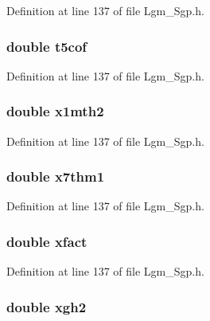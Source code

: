 Definition at line 137 of file Lgm\_\-Sgp.h.\hypertarget{struct___sgp_info_3770068f50d6a8b4a73dcec1e8967087}{
\subsubsection[{t5cof}]{\setlength{\rightskip}{0pt plus 5cm}double {\bf t5cof}}}
\label{struct___sgp_info_3770068f50d6a8b4a73dcec1e8967087}




Definition at line 137 of file Lgm\_\-Sgp.h.\hypertarget{struct___sgp_info_1e0131f4c92de0fd372d35e3b9edb9f4}{
\subsubsection[{x1mth2}]{\setlength{\rightskip}{0pt plus 5cm}double {\bf x1mth2}}}
\label{struct___sgp_info_1e0131f4c92de0fd372d35e3b9edb9f4}




Definition at line 137 of file Lgm\_\-Sgp.h.\hypertarget{struct___sgp_info_1db2d8883d9dd784b6ae51a031c1266e}{
\subsubsection[{x7thm1}]{\setlength{\rightskip}{0pt plus 5cm}double {\bf x7thm1}}}
\label{struct___sgp_info_1db2d8883d9dd784b6ae51a031c1266e}




Definition at line 137 of file Lgm\_\-Sgp.h.\hypertarget{struct___sgp_info_34389a85dd8a65ed941cc23793d4efbf}{
\subsubsection[{xfact}]{\setlength{\rightskip}{0pt plus 5cm}double {\bf xfact}}}
\label{struct___sgp_info_34389a85dd8a65ed941cc23793d4efbf}




Definition at line 137 of file Lgm\_\-Sgp.h.\hypertarget{struct___sgp_info_12cc589dda276aa5ae735902e6778b7c}{
\subsubsection[{xgh2}]{\setlength{\rightskip}{0pt plus 5cm}double {\bf xgh2}}}
\label{struct___sgp_info_12cc589dda276aa5ae735902e6778b7c}




